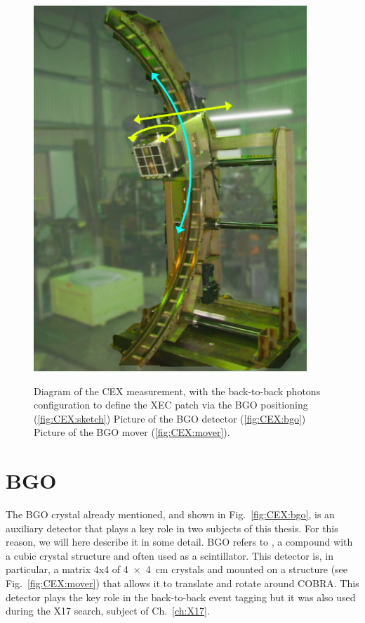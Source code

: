 \begin{refsection}
\begin{figure}[ht]
{        \includegraphics[height=\h, keepaspectratio]{Figures/LH2/BGO_mover.png}\label{fig:CEX:mover}}
        \caption{Diagram of the CEX measurement, with the back-to-back photons configuration to define the XEC patch via the BGO positioning (\ref{fig:CEX:sketch}) Picture of the BGO detector (\ref{fig:CEX:bgo}) Picture of the BGO mover (\ref{fig:CEX:mover}).}
        \label{fig:CEX}
    \end{figure}

\section{BGO}
    \label{sec:LH2:BGO}
    The BGO crystal already mentioned, and shown in Fig.~\ref{fig:CEX:bgo}, is an auxiliary detector that plays a key role in two subjects of this thesis.
    For this reason, we will here describe it in some detail.
    BGO refers to , a compound with a cubic crystal structure and often used as a scintillator.
    This detector is, in particular, a matrix 4x4 of \SI{4x4}{cm} crystals and mounted on a structure (see Fig.~\ref{fig:CEX:mover}) that allows it to translate and rotate around COBRA.
    This detector plays the key role in the back-to-back event tagging but it was also used during the X17 search, subject of Ch.~\ref{ch:X17}.


\end{refsection}

